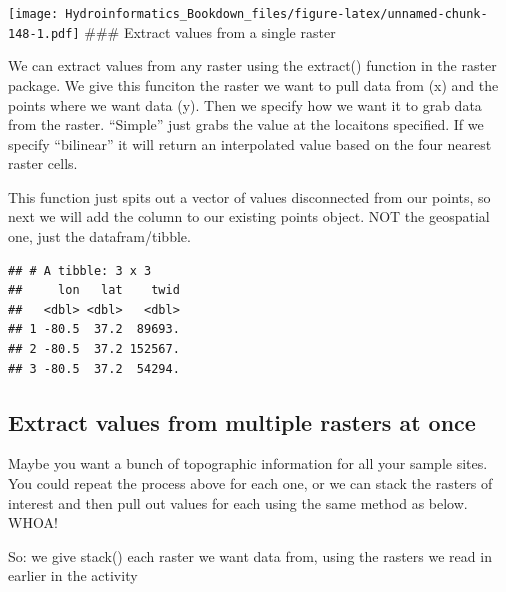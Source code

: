 \documentclass[
]{book}
\newenvironment{Shaded}{\begin{snugshade}}{\end{snugshade}}
\newcommand{\AttributeTok}[1]{\textcolor[rgb]{0.77,0.63,0.00}{#1}}
\newcommand{\CommentTok}[1]{\textcolor[rgb]{0.56,0.35,0.01}{\textit{#1}}}
\newcommand{\FunctionTok}[1]{\textcolor[rgb]{0.00,0.00,0.00}{#1}}
\newcommand{\NormalTok}[1]{#1}
\newcommand{\OtherTok}[1]{\textcolor[rgb]{0.56,0.35,0.01}{#1}}
\newcommand{\SpecialCharTok}[1]{\textcolor[rgb]{0.00,0.00,0.00}{#1}}
\newcommand{\StringTok}[1]{\textcolor[rgb]{0.31,0.60,0.02}{#1}}
\begin{document}
\texttt{[image: Hydroinformatics\_Bookdown\_files/figure-latex/unnamed-chunk-148-1.pdf]}
\#\#\# Extract values from a single raster

We can extract values from any raster using the extract() function in the raster package. We give this funciton the raster we want to pull data from (x) and the points where we want data (y). Then we specify how we want it to grab data from the raster. ``Simple'' just grabs the value at the locaitons specified. If we specify ``bilinear'' it will return an interpolated value based on the four nearest raster cells.

This function just spits out a vector of values disconnected from our points, so next we will add the column to our existing points object. NOT the geospatial one, just the datafram/tibble.

\begin{Shaded}
\end{Shaded}

\begin{verbatim}
## # A tibble: 3 x 3
##     lon   lat    twid
##   <dbl> <dbl>   <dbl>
## 1 -80.5  37.2  89693.
## 2 -80.5  37.2 152567.
## 3 -80.5  37.2  54294.
\end{verbatim}

\hypertarget{extract-values-from-multiple-rasters-at-once}{%
\subsection{Extract values from multiple rasters at once}\label{extract-values-from-multiple-rasters-at-once}}

Maybe you want a bunch of topographic information for all your sample sites. You could repeat the process above for each one, or we can stack the rasters of interest and then pull out values for each using the same method as below. WHOA!

So: we give stack() each raster we want data from, using the rasters we read in earlier in the activity
\end{document}
